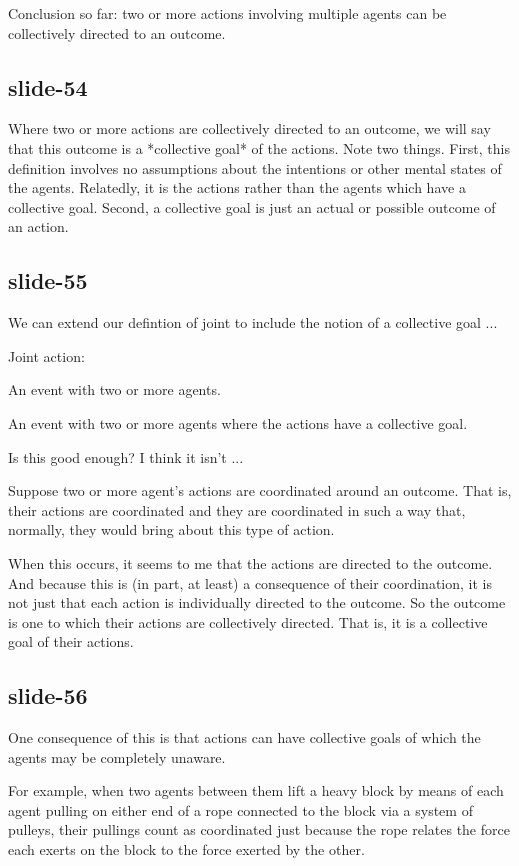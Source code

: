 \documentclass[12pt,\papersize]{extarticle}
\begin{document}
Conclusion so far: two or more actions involving multiple agents can be collectively
directed to an outcome.

\subsection{slide-54}
Where two or more actions are collectively directed to an outcome, we will say that this
outcome is a *collective goal* of the actions.
Note two things.
First, this definition involves no assumptions about the intentions or other mental states
of the agents.  Relatedly, it is the actions rather than the agents which have a collective goal.
Second, a collective goal is just an actual or possible outcome of an action.

\subsection{slide-55}
We can extend our defintion of joint to include the notion
of a collective goal ...

Joint action:



An event with two or more agents.





An event with two or more agents where the actions have a collective goal.


Is this good enough?  I think it isn’t ...

Suppose two or more agent’s actions are coordinated around an outcome.
That is, their actions are coordinated and they are coordinated in
such a way that, normally, they would bring about this type of action.

When this occurs, it seems to me that the actions are directed to the outcome.
And because this is (in part, at least) a consequence of their coordination,
it is not just that each action is individually directed to the outcome.
So the outcome is one to which their actions are collectively directed.
That is, it is a collective goal of their actions.

\subsection{slide-56}
One consequence of this is that actions can have collective goals of which
the agents may be completely unaware.

For example, when two agents between them lift a heavy block by means of each agent pulling on either end of a rope connected to the block via a system of pulleys, their pullings count as coordinated just because the rope relates the force each exerts on the block to the force exerted by the other.
\end{document}
